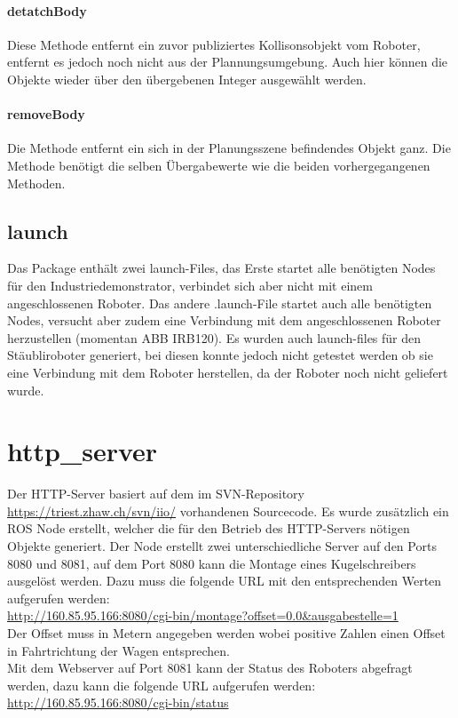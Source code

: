 \paragraph{detatchBody}
Diese Methode entfernt ein zuvor publiziertes Kollisonsobjekt vom Roboter, entfernt es jedoch noch nicht aus der Plannungsumgebung. Auch hier können die Objekte wieder über den übergebenen Integer ausgewählt werden.

\paragraph{removeBody}
Die Methode entfernt ein sich in der Planungsszene befindendes Objekt ganz. Die Methode benötigt die selben Übergabewerte wie die beiden vorhergegangenen Methoden.

\subsection{launch}
Das Package enthält zwei launch-Files, das Erste startet alle benötigten Nodes für den Industriedemonstrator, verbindet sich aber nicht mit einem angeschlossenen Roboter. Das andere .launch-File startet auch alle benötigten Nodes, versucht aber zudem eine Verbindung mit dem angeschlossenen Roboter herzustellen (momentan ABB IRB120).
Es wurden auch launch-files für den Stäubliroboter generiert, bei diesen konnte jedoch nicht getestet werden ob sie eine Verbindung mit dem Roboter herstellen, da der Roboter noch nicht geliefert wurde.

\section{http\_server}
Der HTTP-Server basiert auf dem im SVN-Repository \url{https://triest.zhaw.ch/svn/iio/} vorhandenen Sourcecode. Es wurde zusätzlich ein ROS Node erstellt, welcher die für den Betrieb des HTTP-Servers nötigen Objekte generiert. Der Node erstellt zwei unterschiedliche Server auf den Ports 8080 und 8081, auf dem Port 8080 kann die Montage eines Kugelschreibers ausgelöst werden. Dazu muss die folgende URL mit den entsprechenden Werten aufgerufen werden:\\
\url{http://160.85.95.166:8080/cgi-bin/montage?offset=0.0\&ausgabestelle=1}\\
Der Offset muss in Metern angegeben werden wobei positive Zahlen einen Offset in Fahrtrichtung der Wagen entsprechen.\\

Mit dem Webserver auf Port 8081 kann der Status des Roboters abgefragt werden, dazu kann die folgende URL aufgerufen werden:\\
\url{http://160.85.95.166:8080/cgi-bin/status}

